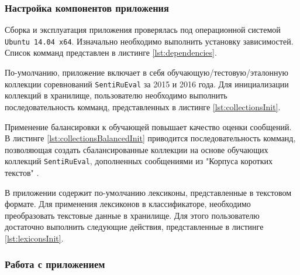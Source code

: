     \subsubsection{Настройка компонентов приложения}
    Сборка и эксплуатация приложения проверялась под операционной системой
    {\tt Ubuntu 14.04 x64}. Изначально необходимо выполнить установку зависимостей.
    Список комманд представлен в листинге \ref{lst:dependencies}.
    \lstset{style=bash}
    

        По-умолчанию, приложение включает в себя обучающую/тестовую/эталонную
        коллекции соревнований {\tt SentiRuEval} за 2015 и 2016 года. Для
        инициализации коллекций в хранилище, пользователю необходимо выполнить
        последовательность комманд, представленных в листинге \ref{lst:collectionsInit}.
        \lstset{style=bash}
        

        Применение балансировки к обучающей повышает качество оценки сообщений.
        \cite{diploma2015} В листинге \ref{lst:collectionsBalancedInit} приводится
        последовательность комманд, позволяющая создать сбалансированные коллекции
        на основе обучающих коллекций {\tt SentiRuEval}, дополненных сообщениями
        из "Корпуса коротких текстов" \cite{rubtsovaCollection}.
        \lstset{style=bash}
        

        В приложении содержит по-умолчанию лексиконы, представленные в текстовом
        формате. Для применения лексиконов в классификаторе, необходимо преобразовать
        текстовые данные в хранилище. Для этого пользователю
        достаточно выполнить следующие действия, представленные в листинге
        \ref{lst:lexiconsInit}.
        \lstset{style=bash}
        

    \subsubsection{Работа с приложением}

